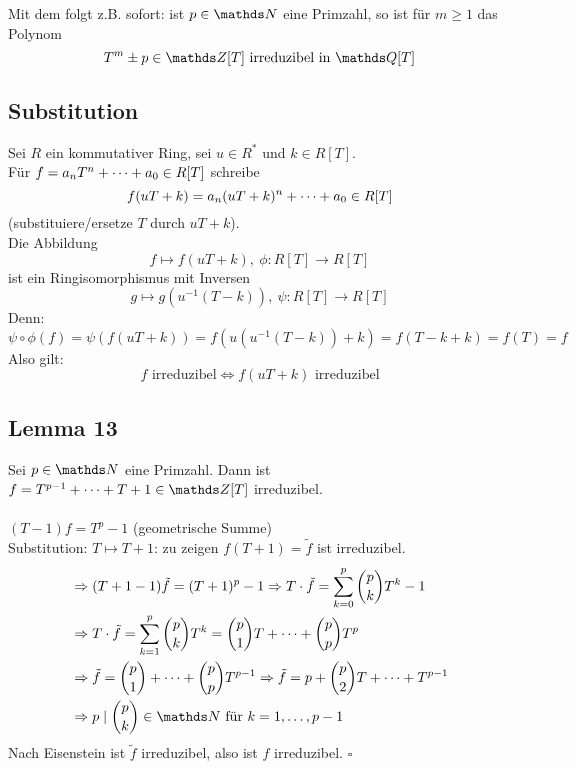 Mit dem  folgt z.B. sofort: ist $p\in\N$ eine Primzahl, so ist für $m\ge 1$ das Polynom
\[
T^m\pm p\in \Z[T]\text{ irreduzibel in }\Q[T]
\]
\newpage
\subsection{Substitution}
\label{sub:substitution}
Sei $R$ ein kommutativer Ring, sei $u\in R^*$ und $k\in R[T]$.\\
Für $f=a_nT^n+ \dots +a_0\in R[T]$ schreibe
\[
f(uT+k)=a_n(uT+k)^n+ \dots +a_0\in R[T]
\]
(substituiere/ersetze $T$ durch $uT+k$).\\
Die Abbildung
\[
f\mapsto f(uT+k),~\phi:R[T]\to R[T]
\]
ist ein Ringisomorphismus mit Inversen
\[
g\mapsto g(u^{-1}(T-k)),~\psi:R[T]\to R[T]
\]
Denn:
\[
\psi\circ\phi(f)=\psi(f(uT+k))=f(u(u^{-1}(T-k))+k)=f(T-k+k)=f(T)=f
\]
Also gilt:
\[
f\text{ irreduzibel}\Leftrightarrow f(uT+k)\text{ irreduzibel}
\]

\subsection{Lemma 13}
\label{sub:lemma_13}
Sei $p\in \N$ eine Primzahl.
Dann ist $f=T^{p-1}\dt{+}T+1\in \Z[T]$ irreduzibel.\\

\\
$(T-1)f=T^p-1$ (geometrische Summe)\\
Substitution: $T\mapsto T+1$: zu zeigen $f(T+1)=\tilde{f}$ ist irreduzibel.
\begin{equation*}
\begin{aligned}
	&\Rightarrow (T+1-1)\tilde{f}=(T+1)^p-1 \Rightarrow T\cdot \tilde{f}=\sum_{k=0}^{p}\binom{p}{k}T^k-1\\
	&\Rightarrow T\cdot \tilde{f}=\sum_{k=1}^{p}\binom{p}{k}T^k=\binom{p}{1}T\dt{+}\binom{p}{p}T^p\\
	&\Rightarrow \tilde{f}=\binom{p}{1}\dt{+}\binom{p}{p}T^{p-1} \Rightarrow \tilde{f}=p+\binom{p}{2}T\dt{+}T^{p-1}\\
	&\Rightarrow p\mid \binom{p}{k}\in \N\text{ für }k=1\dt{,}p-1
\end{aligned}
\end{equation*}
Nach Eisenstein ist $\tilde{f}$ irreduzibel, also ist $f$ irreduzibel.
\hfill $\square$

